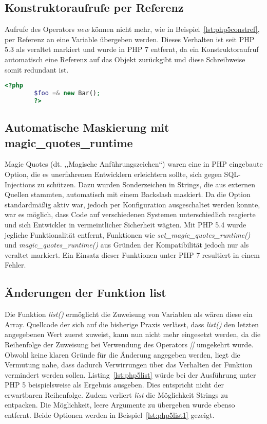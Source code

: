     \subsection{Konstruktoraufrufe per Referenz}
    Aufrufe des Operators \textit{new} können nicht mehr, wie in Beispiel~\ref{lst:php5constref}, per Referenz an eine Variable übergeben werden. Dieses Verhalten ist seit \ac{PHP} 5.3 als veraltet 
    markiert und wurde in \ac{PHP} 7 entfernt, da ein Konstruktoraufruf automatisch eine Referenz auf das Objekt zurückgibt und diese Schreibweise 
    somit redundant ist.\cite{php_group_php:_nodate-5}

    \begin{lstlisting}[language=php, caption={Beispiel des Konstruktoraufrufs per Referenz}, label={lst:php5constref}]
        <?php
        $foo =& new Bar();
        ?>
    \end{lstlisting}

    \subsection{Automatische Maskierung mit magic\_quotes\_runtime}\label{php5magicquotes}
    Magic Quotes (dt. ,,Magische Anführungszeichen``) waren eine in \ac{PHP} eingebaute Option, die es unerfahrenen Entwicklern 
    erleichtern sollte, sich gegen SQL-Injections zu schützen. Dazu wurden Sonderzeichen in Strings, die aus externen Quellen 
    stammten, automatisch mit einem Backslash maskiert. Da die Option standardmäßig aktiv war, jedoch per Konfiguration 
    ausgeschaltet werden konnte, war es möglich, dass Code auf verschiedenen Systemen unterschiedlich reagierte und sich 
    Entwickler in vermeintlicher Sicherheit wägten.\cite{php_group_php:_nodate-4} Mit \ac{PHP} 5.4 wurde jegliche Funktionalität entfernt, Funktionen wie 
    \textit{set\_magic\_quotes\_runtime()} und \textit{magic\_quotes\_runtime()} aus Gründen der Kompatibilität jedoch 
    nur als veraltet markiert. Ein Einsatz dieser Funktionen unter \ac{PHP} 7 resultiert in einem Fehler. 
    
    \subsection{Änderungen der Funktion list}\label{php5listChanges}
    Die Funktion \textit{list()} ermöglicht die Zuweisung von Variablen als wären diese ein Array. Quellcode der sich auf die bisherige Praxis verlässt, dass \textit{list()}
    den letzten angegebenen Wert zuerst zuweist, kann nun nicht mehr eingesetzt werden, da die Reihenfolge der Zuweisung bei Verwendung des Operators \textit{[]} umgekehrt wurde. 
    Obwohl keine klaren Gründe für die Änderung angegeben werden, liegt die Vermutung nahe, dass dadurch Verwirrungen über das Verhalten der Funktion vermindert werden sollen. 
    Listing~\ref{lst:php5list} würde bei der Ausführung unter \acs{PHP} 5 beispielsweise \grqq{} als Ergebnis ausgeben. Dies entspricht nicht der erwartbaren Reihenfolge.
    Zudem verliert \textit{list} die Möglichkeit Strings zu entpacken. Die Möglichkeit, leere Argumente zu übergeben wurde ebenso entfernt. Beide Optionen werden in 
    Beispiel~\ref{lst:php5list1} gezeigt.

